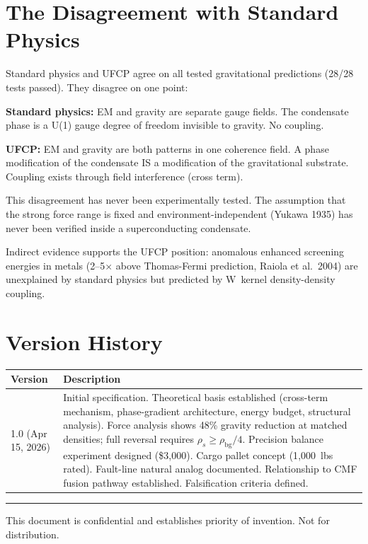 \documentclass[11pt, a4paper]{article}
\begin{document}
\section{The Disagreement with Standard Physics}

Standard physics and UFCP agree on all tested gravitational
predictions (28/28 tests passed). They disagree on one point:

\textbf{Standard physics:} EM and gravity are separate gauge
fields. The condensate phase is a U(1) gauge degree of freedom
invisible to gravity. No coupling.

\textbf{UFCP:} EM and gravity are both patterns in one
coherence field. A phase modification of the condensate IS a
modification of the gravitational substrate. Coupling exists
through field interference (cross term).

This disagreement has never been experimentally tested. The
assumption that the strong force range is fixed and
environment-independent (Yukawa 1935) has never been verified
inside a superconducting condensate.

Indirect evidence supports the UFCP position: anomalous
enhanced screening energies in metals (2--5$\times$ above
Thomas-Fermi prediction, Raiola et al.~2004) are unexplained
by standard physics but predicted by W~kernel density-density
coupling.

\section{Version History}

\begin{center}
\begin{tabular}{@{}lp{10.5cm}@{}}
\toprule
\textbf{Version} & \textbf{Description} \\
\midrule
1.0 (Apr 15, 2026) & Initial specification. Theoretical basis
  established (cross-term mechanism, phase-gradient architecture,
  energy budget, structural analysis). Force analysis shows 48\%
  gravity reduction at matched densities; full reversal requires
  $\rho_s \geq \rho_{\text{bg}}/4$. Precision balance experiment
  designed (\$3{,}000). Cargo pallet concept (1{,}000~lbs rated).
  Fault-line natural analog documented. Relationship to CMF
  fusion pathway established. Falsification criteria defined. \\
\bottomrule
\end{tabular}
\end{center}

\vspace{2em}
\hrule
\vspace{0.5em}
{\color{nm-gray}\small This document is confidential and
establishes priority of invention. Not for distribution.}
\end{document}
